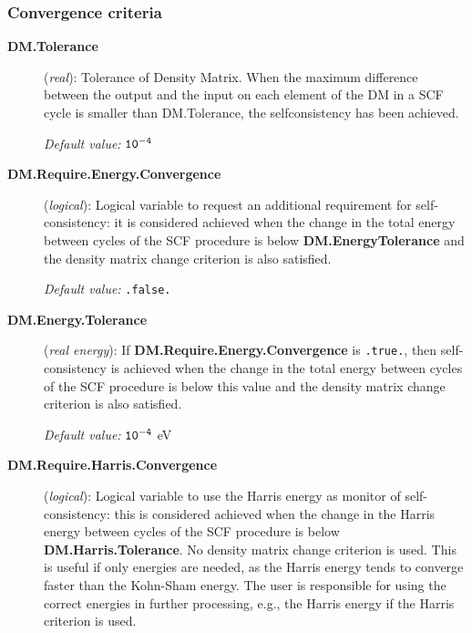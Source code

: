\documentclass[11pt]{article}
\begin{document}
\subsubsection{Convergence criteria}

\begin{description}
\item[{\bf DM.Tolerance}] ({\it real}):
Tolerance of Density Matrix.
When the maximum difference between the output and the
input on each element of the DM
in a SCF cycle is smaller than DM.Tolerance,
the selfconsistency has been achieved.

{\it Default value:} {${\tt 10^{-4}}$}



\item[{\bf DM.Require.Energy.Convergence}] ({\it logical}):
Logical variable to request an additional requirement for
self-consistency: it is considered achieved when the change in the total energy between cycles
of the SCF procedure is below {\bf DM.EnergyTolerance} and the
density matrix change criterion is also satisfied.

{\it Default value:} {\tt .false.}

\item[{\bf DM.Energy.Tolerance}] ({\it real energy}):
If {\bf DM.Require.Energy.Convergence} is {\tt .true.}, then
self-consistency is achieved when the change in the total energy between cycles
of the SCF procedure is below this value and the
density matrix change criterion is also satisfied.

{\it Default value:} {${\tt 10^{-4}}$ eV}

\item[{\bf DM.Require.Harris.Convergence}] ({\it logical}):
Logical variable to use the Harris energy as monitor of
self-consistency: this is considered achieved when the change in the Harris energy between cycles
of the SCF procedure is below {\bf DM.Harris.Tolerance}. No density
matrix change criterion is used.
This is useful if only energies are needed, as the Harris energy tends
to converge faster than the Kohn-Sham energy.
The user is responsible for using the correct energies in further
processing, e.g., the Harris energy if the Harris criterion is used.


\end{description}
\end{document}
